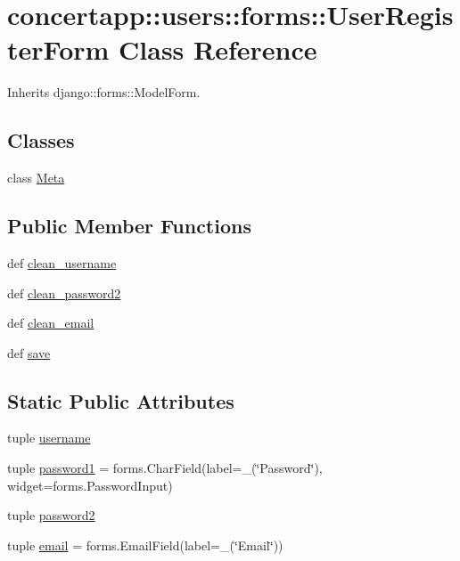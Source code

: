 \hypertarget{classconcertapp_1_1users_1_1forms_1_1_user_register_form}{
\section{concertapp::users::forms::UserRegisterForm Class Reference}
\label{classconcertapp_1_1users_1_1forms_1_1_user_register_form}
}


Inherits django::forms::ModelForm.

\subsection*{Classes}
\begin{DoxyCompactItemize}
\item 
class \hyperlink{classconcertapp_1_1users_1_1forms_1_1_user_register_form_1_1_meta}{Meta}
\end{DoxyCompactItemize}
\subsection*{Public Member Functions}
\begin{DoxyCompactItemize}
\item 
def \hyperlink{classconcertapp_1_1users_1_1forms_1_1_user_register_form_aeffd79420455e4bd3497578b81fb9f0f}{clean\_\-username}
\item 
def \hyperlink{classconcertapp_1_1users_1_1forms_1_1_user_register_form_ac08d05d6d9bcddff78b7bd2be0522355}{clean\_\-password2}
\item 
def \hyperlink{classconcertapp_1_1users_1_1forms_1_1_user_register_form_a6740d533e25266fb3b265ffe7ba49cc4}{clean\_\-email}
\item 
def \hyperlink{classconcertapp_1_1users_1_1forms_1_1_user_register_form_ad35da9d7d058ca893543123938a1223f}{save}
\end{DoxyCompactItemize}
\subsection*{Static Public Attributes}
\begin{DoxyCompactItemize}
\item 
tuple \hyperlink{classconcertapp_1_1users_1_1forms_1_1_user_register_form_a9b360fa9bfa5130e230ce2c360fcf920}{username}
\item 
tuple \hyperlink{classconcertapp_1_1users_1_1forms_1_1_user_register_form_aa1a336ebd6e4b3db159adddc0fa4a5dd}{password1} = forms.CharField(label=\_\-(\char`\"{}Password\char`\"{}), widget=forms.PasswordInput)
\item 
tuple \hyperlink{classconcertapp_1_1users_1_1forms_1_1_user_register_form_aeab66be8612b1125afe40fe53a5ed579}{password2}
\item 
tuple \hyperlink{classconcertapp_1_1users_1_1forms_1_1_user_register_form_a9b9bfa2a3100f3025068edee155a8a04}{email} = forms.EmailField(label=\_\-(\char`\"{}Email\char`\"{}))
\end{DoxyCompactItemize}


